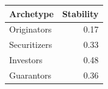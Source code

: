 \begin{tabular}{lr}
\toprule
Archetype & Stability \\
\midrule
Originators & 0.17 \\
Securitizers & 0.33 \\
Investors & 0.48 \\
Guarantors & 0.36 \\
\bottomrule
\end{tabular}

